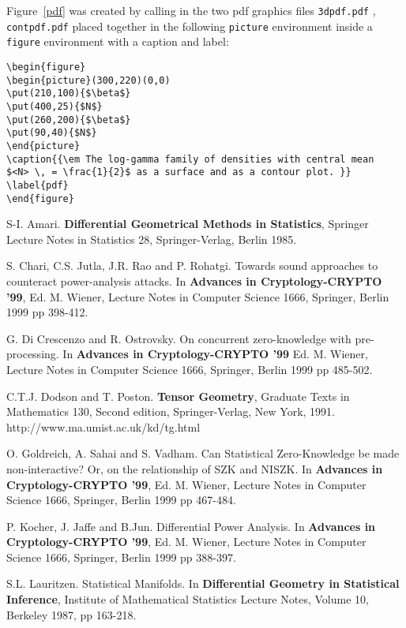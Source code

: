 \documentclass[a4paper,twoside]{article}      %
\begin{document}
Figure~\ref{pdf} was created by calling in the two pdf graphics files
{\tt 3dpdf.pdf} , {\tt contpdf.pdf}
placed together in the following {\tt picture} environment
inside a {\tt figure} environment with a caption and label:
\begin{verbatim}
\begin{figure}
\begin{picture}(300,220)(0,0)
\put(210,100){$\beta$}
\put(400,25){$N$}
\put(260,200){$\beta$}
\put(90,40){$N$}
\end{picture}
\caption{{\em The log-gamma family of densities with central mean
$<N> \, = \frac{1}{2}$ as a surface and as a contour plot. }}
\label{pdf}
\end{figure}
\end{verbatim}






\begin{thebibliography}{99}
 S-I. Amari. {\bf Differential Geometrical Methods in
Statistics}, Springer Lecture Notes in Statistics 28,
Springer-Verlag, Berlin 1985.

 S. Chari, C.S. Jutla, J.R. Rao and P. Rohatgi.
Towards sound approaches to counteract power-analysis attacks. In
{\bf Advances in Cryptology-CRYPTO '99}, Ed. M. Wiener, Lecture
Notes in Computer Science 1666, Springer, Berlin 1999 pp 398-412.

 G. Di Crescenzo and R. Ostrovsky.
On concurrent zero-knowledge with pre-processing. In {\bf Advances
in Cryptology-CRYPTO '99}  Ed. M. Wiener, Lecture Notes in
Computer Science 1666, Springer, Berlin 1999 pp 485-502.

 C.T.J. Dodson and T. Poston. {\bf Tensor Geometry}, Graduate
Texts in Mathematics 130, Second edition, Springer-Verlag, New
York, 1991. 
{http://www.ma.umist.ac.uk/kd/tg.html}


 O. Goldreich, A. Sahai and S. Vadham.
Can Statistical Zero-Knowledge be made non-interactive? Or, on the
relationship of SZK and NISZK. In {\bf Advances in
Cryptology-CRYPTO '99},  Ed. M. Wiener, Lecture Notes in Computer
Science 1666, Springer, Berlin 1999 pp 467-484.

 P. Kocher, J. Jaffe and B.Jun.
Differential Power Analysis. In {\bf Advances in Cryptology-CRYPTO
'99},  Ed. M. Wiener, Lecture Notes in Computer Science 1666,
Springer, Berlin 1999 pp 388-397.

 S.L. Lauritzen. Statistical Manifolds. In {\bf
Differential Geometry in Statistical Inference}, Institute of
Mathematical Statistics Lecture Notes, Volume 10, Berkeley 1987,
pp 163-218.

\end{thebibliography}
\end{document}
